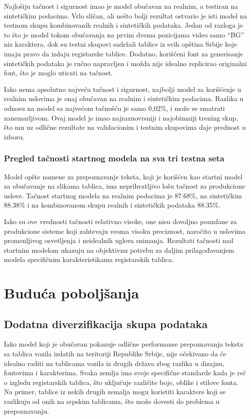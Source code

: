 \documentclass[a4paper,12pt]{article}
\begin{document}
	Najlošiju tačnost i sigurnost imao je model obučavan na realnim, a testiran na sintetičkim podacima. Vrlo sličan, ali nešto bolji rezultat ostvario je isti model na testnom skupu kombinovanih realnih i sintetičkih podataka. Jedan od razloga je to što je model tokom obučavanja na prvim dvema pozicijama video samo \enquote{BG} niz karaktera, dok su testni skupovi sadržali tablice iz svih opština Srbije koje imaju pravo da izdaju registarske tablice. Dodatno, korišćeni font za generisanje sintetičkih podataka je ručno napravljen i možda nije idealno replicirao originalni font, što je moglo uticati na tačnost.
	
	Iako nema apsolutno najveću tačnost i sigurnost, najbolji model za korišćenje u realnim uslovima je onaj obučavan na realnim i sintetičkim podacima. Razlika u odnosu na model sa najvećom tačnošću je samo 0,02\%, i može se smatrati zanemarljivom. Ovaj model je imao najraznovrsniji i najobimniji trening skup, što mu uz odlične rezultate na validacionim i testnim skupovima daje prednost u izboru.
	
	\subsubsection{Pregled tačnosti startnog modela na sva tri testna seta}
	Model opšte namene za prepoznavanje teksta, koji je korišćen kao startni model za obučavanje na slikama tablica, ima neprihvatljivo lošu tačnost za produkcione uslove. Tačnost startnog modela na realnim podacima je 87.68\%, na sintetičkim 88.38\% i na kombinovanom skupu realnih i sintetičkih podataka 88.35\%.
	
	Iako su ove vrednosti tačnosti relativno visoke, one nisu dovoljno pouzdane za produkcione sisteme koji zahtevaju veoma visoku preciznost, naročito u uslovima promenljivog osvetljenja i neidealnih uglova snimanja. Rezultati tačnosti nad startnim modelom ukazuju na objektivnu potrebu za daljim prilagođavanjem modela specifičnim karakteristikama registarskih tablica.
	\newpage
	
	\section{Buduća poboljšanja}
	
	\subsection{Dodatna diverzifikacija skupa podataka}
	Iako model koji je obučavan pokazuje odlične performanse prepoznavanja teksta sa tablica vozila izdatih na teritoriji Republike Srbije, nije očekivano da će idealno raditi na tablicama vozila iz drugih država zbog razlika u dizajnu, fontovima i karakterima. Svaka zemlja ima svoje specifične standarde kada je reč o izgledu registarskih tablica, što uključuje različite boje, oblike i stilove fonta. Na primer, tablice iz nekih drugih zemalja mogu koristiti karaktere koji se razlikuju od onih na srpskim tablicama, što može dovesti do problema u prepoznavanju.
	
\end{document}
